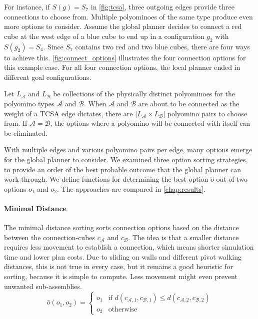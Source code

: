 For instance, if $S(g) = S_7$ in \autoref{fig:tcsa}, three outgoing edges provide three connections to choose from.
Multiple polyominoes of the same type produce even more options to consider.
Assume the global planner decides to connect a red cube at the west edge of a blue cube to end up in a configuration $g_2$ with $S(g_2) = S_4$.
Since $S_7$ contains two red and two blue cubes, there are four ways to achieve this.
\autoref{fig:connect_options} illustrates the four connection options for this example case.
For all four connection options, the local planner ended in different goal configurations.

Let $L_\mathcal{A}$ and $L_\mathcal{B}$ be collections of the physically distinct polyominoes for the polyomino types $\mathcal{A}$ and $\mathcal{B}$.
When $\mathcal{A}$ and $\mathcal{B}$ are about to be connected as the weight of a TCSA edge dictates, there are $\left| L_\mathcal{A} \times L_\mathcal{B} \right|$ polyomino pairs to choose from.
If $\mathcal{A} = \mathcal{B}$, the options where a polyomino will be connected with itself can be eliminated.

With multiple edges and various polyomino pairs per edge, many options emerge for the global planner to consider.
We examined three option sorting strategies, to provide an order of the best probable outcome that the global planner can work through. 
We define functions for determining the best option $\hat{o}$ out of two options $o_1$ and $o_2$.
The approaches are compared in \autoref{chap:results}.

\paragraph{Minimal Distance}

The minimal distance sorting sorts connection options based on the distance between the connection-cubes $c_\mathcal{A}$ and $c_\mathcal{B}$.
The idea is that a smaller distance requires less movement to establish a connection, which means shorter simulation time and lower plan costs.
Due to sliding on walls and different pivot walking distances, this is not true in every case, but it remains a good heuristic for sorting, because it is simple to compute.
Less movement might even prevent unwanted sub-assemblies.
\begin{equation}
\hat{o}(o_1, o_2) =
\begin{cases}
o_1 & \text{if } d(c_{\mathcal{A},1}, c_{\mathcal{B},1}) \leq d(c_{\mathcal{A},2}, c_{\mathcal{B},2}) \\
o_2 & \text{otherwise}
\end{cases}
\end{equation}

